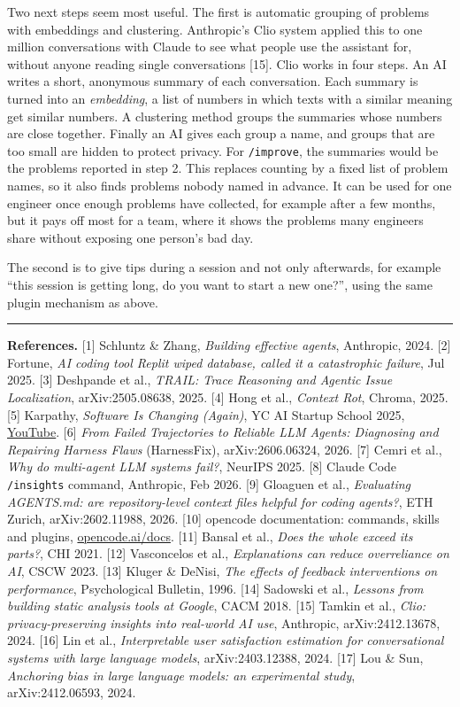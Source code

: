 \documentclass[10pt,twocolumn]{article}
\begin{document}
Two next steps seem most useful. The first is automatic grouping of problems with embeddings and clustering. Anthropic's Clio system applied this to one million conversations with Claude to see what people use the assistant for, without anyone reading single conversations [15]. Clio works in four steps. An AI writes a short, anonymous summary of each conversation. Each summary is turned into an \emph{embedding}, a list of numbers in which texts with a similar meaning get similar numbers. A clustering method groups the summaries whose numbers are close together. Finally an AI gives each group a name, and groups that are too small are hidden to protect privacy. For \texttt{/improve}, the summaries would be the problems reported in step 2. This replaces counting by a fixed list of problem names, so it also finds problems nobody named in advance. It can be used for one engineer once enough problems have collected, for example after a few months, but it pays off most for a team, where it shows the problems many engineers share without exposing one person's bad day.

The second is to give tips during a session and not only afterwards, for example ``this session is getting long, do you want to start a new one?'', using the same plugin mechanism as above.

\vspace{3pt}
\hrule
\vspace{3pt}
{\scriptsize
\textbf{References.}
[1] Schluntz \& Zhang, \emph{Building effective agents}, Anthropic, 2024.
[2] Fortune, \emph{AI coding tool Replit wiped database, called it a catastrophic failure}, Jul 2025.
[3] Deshpande et al., \emph{TRAIL: Trace Reasoning and Agentic Issue Localization}, arXiv:2505.08638, 2025.
[4] Hong et al., \emph{Context Rot}, Chroma, 2025.
[5] Karpathy, \emph{Software Is Changing (Again)}, YC AI Startup School 2025, \href{https://youtube.com/watch?v=LCEmiRjPEtQ}{YouTube}.
[6] \emph{From Failed Trajectories to Reliable LLM Agents: Diagnosing and Repairing Harness Flaws} (HarnessFix), arXiv:2606.06324, 2026.
[7] Cemri et al., \emph{Why do multi-agent LLM systems fail?}, NeurIPS 2025.
[8] Claude Code \texttt{/insights} command, Anthropic, Feb 2026.
[9] Gloaguen et al., \emph{Evaluating AGENTS.md: are repository-level context files helpful for coding agents?}, ETH Zurich, arXiv:2602.11988, 2026.
[10] opencode documentation: commands, skills and plugins, \href{https://opencode.ai/docs/commands}{opencode.ai/docs}.
[11] Bansal et al., \emph{Does the whole exceed its parts?}, CHI 2021.
[12] Vasconcelos et al., \emph{Explanations can reduce overreliance on AI}, CSCW 2023.
[13] Kluger \& DeNisi, \emph{The effects of feedback interventions on performance}, Psychological Bulletin, 1996.
[14] Sadowski et al., \emph{Lessons from building static analysis tools at Google}, CACM 2018.
[15] Tamkin et al., \emph{Clio: privacy-preserving insights into real-world AI use}, Anthropic, arXiv:2412.13678, 2024.
[16] Lin et al., \emph{Interpretable user satisfaction estimation for conversational systems with large language models}, arXiv:2403.12388, 2024.
[17] Lou \& Sun, \emph{Anchoring bias in large language models: an experimental study}, arXiv:2412.06593, 2024.\par
}
\end{document}
